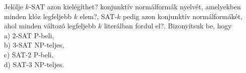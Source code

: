 
\begin{Exercise}[counter={sorszam}, difficulty=0]
	Jelölje $k$-SAT azon kielégíthet? konjunktív normálformák nyelvét, amelyekben minden klóz
	legfeljebb $k$ elem?, SAT-$k$ pedig azon konjunktív normálformákét, ahol minden változó legfeljebb $k$
	literálban fordul el?. Bizonyítsuk be, hogy\\
	a) 2-SAT P-beli,\\
	b) 3-SAT NP-teljes,\\
	c) SAT-2 P-beli,\\
	d) SAT-3 NP-teljes. 
\end{Exercise}	
